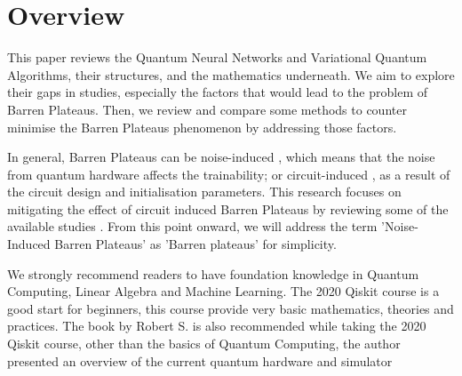 \section{Overview}
This paper reviews the Quantum Neural Networks and Variational Quantum Algorithms, their structures, and the mathematics underneath. 
We aim to explore their gaps in studies, especially the factors that would lead to the problem of Barren Plateaus.
Then, we review and compare some methods to counter minimise the Barren Plateaus phenomenon by addressing those factors.

In general, Barren Plateaus can be noise-induced \cite{wangNoiseinducedBarrenPlateaus2021}, which means that the noise from quantum hardware affects the trainability; 
or circuit-induced \cite{mccleanBarrenPlateausQuantum2018}, as a result of the circuit design and initialisation parameters.
This research focuses on mitigating the effect of circuit induced Barren Plateaus by reviewing some of the available studies \cite{pesahAbsenceBarrenPlateaus2021, cerezoCostFunctionDependent2021, skolikLayerwiseLearningQuantum2021}.
From this point onward, we will address the term 'Noise-Induced Barren Plateaus' as 'Barren plateaus' for simplicity.

We strongly recommend readers to have foundation knowledge in Quantum Computing, Linear Algebra and Machine Learning. 
The 2020 Qiskit course \cite{2020QiskitGlobal} is a good start for beginners, this course provide very basic mathematics, theories and practices. 
The book \cite{sutorDancingQubitsHow2019} by Robert S. is also recommended while taking the 2020 Qiskit course, other than the basics of Quantum Computing, the author presented an overview of the current quantum hardware and simulator